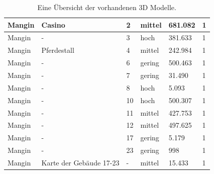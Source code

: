 \begin{table}[h]
\begin{tabular}{|p{}|p{}|p{}|p{}|p{}|p{}|}
        Mangin  & Casino                                        & 2     & mittel        & 681.082    & 1                \\ \hline
        Mangin  & -                                             & 3     & hoch          & 381.633    & 1                \\ \hline
        Mangin  & Pferdestall                                   & 4     & mittel        & 242.984    & 1                \\ \hline
        Mangin  & -                                             & 6     & gering        & 500.463    & 1                \\ \hline
        Mangin  & -                                             & 7     & gering        & 31.490     & 1                \\ \hline
        Mangin  & -                                             & 8     & hoch          & 5.093      & 1                \\ \hline
        Mangin  & -                                             & 10    & hoch          & 500.307    & 1                \\ \hline
        Mangin  & -                                             & 11    & mittel        & 427.753    & 1                \\ \hline
        Mangin  & -                                             & 12    & mittel        & 497.625    & 1                \\ \hline
        Mangin  & -                                             & 17    & gering        & 5.179      & 1                \\ \hline
        Mangin  & -                                             & 23    & gering        & 998        & 1                \\ \hline
        Mangin  & Karte der Gebäude 17-23                       & -     & mittel        & 15.433     & 1                \\ \hline
    \end{tabular}
    \caption{Eine Übersicht der vorhandenen 3D Modelle.}
    \label{tab:uebersicht-3Dmodelle}
\end{table}
